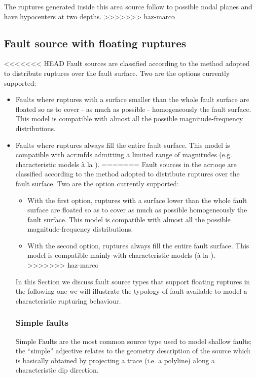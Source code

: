 The ruptures generated inside this area source follow to possible nodal 
planes and have hypocenters at two depths. 
>>>>>>> haz-marco
%
\subsection{Fault source with floating ruptures}
%
<<<<<<< HEAD
Fault sources are classified according to the method adopted to 
distribute ruptures over the fault surface. Two are the options 
currently supported: 
\begin{itemize}
    \item Faults where ruptures with a surface smaller than the 
        whole fault surface are floated so as to cover - as much 
        as possible - homogeneously the fault surface.
        This model is compatible with almost all the possible 
        magnitude-frequency distributions.
    \item Faults where ruptures always fill the entire fault 
        surface. This model is compatible with \glspl{acr:mfd} 
        admitting a limited range of magnitudes (e.g. characteristic 
        models \`{a} la \cite{schwartz1984}).
=======
Fault sources in the \gls{acr:oqe} are classified according to the method 
adopted to distribute ruptures over the fault surface. 
Two are the option currently supported: 
\begin{itemize}
    \item With the first option, ruptures with a surface lower than the 
		whole fault surface are floated so as to cover as much as 
		possible homogeneously the fault surface.
        This model is compatible with almost all the possible 
        magnitude-frequency distributions.
    \item With the second option, ruptures always fill the entire fault 
		surface. This model is 
        compatible mainly with characteristic models (\`{a} la 
        \cite{schwartz1984}).
>>>>>>> haz-marco
\end{itemize}
In this Section we discuss fault source types that support floating ruptures
in the following one we will illustrate the typology of fault available to 
model a characteristic rupturing behaviour.
%
\subsubsection{Simple faults}
%
Simple Faults are the most common source type used to model shallow 
faults; the ``simple'' adjective relates to the geometry description 
of the source which is basically obtained by projecting a trace 
(i.e. a polyline) along a characteristic dip direction. 


\end{itemize}
